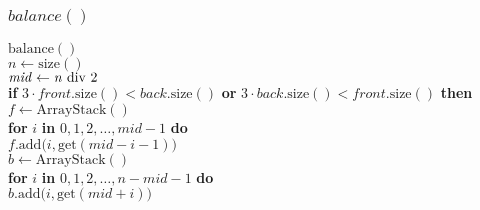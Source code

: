 \documentclass{beamer}
\begin{document}
\begin{frame}[shrink]
\frametitle{$balance()$}
\begin{oframed}
\begin{flushleft}
 $\ensuremath{\mathrm{balance}()}$\\
 \hspace*{0.5em} $\ensuremath{\ensuremath{\mathit{n}} \gets  \ensuremath{\mathrm{size}()}}$\\
 \hspace*{0.5em} $\ensuremath{\ensuremath{\mathit{mid}} \gets  \ensuremath{\ensuremath{\mathit{n}} $ div $2}}$\\
 \hspace*{0.5em} {\color{black} \textbf{if}} $\ensuremath{3\cdot \ensuremath{\mathit{front}}.\mathrm{size}() < \ensuremath{\mathit{back}}.\mathrm{size}()}$ {\color{black} \textbf{or}} $\ensuremath{3\cdot \ensuremath{\mathit{back}}.\mathrm{size}() < \ensuremath{\mathit{front}}.\mathrm{size}()}$ {\color{black} \textbf{then}} \\
\hspace*{0.5em} \hspace*{1em} $\ensuremath{\ensuremath{\mathit{f}} \gets  \ensuremath{\mathrm{\mathrm{ArrayStack}}()}}$\\
\hspace*{0.5em} \hspace*{1em} {\color{black} \textbf{for}} $\ensuremath{i}$ {\color{black} \textbf{in}} $\ensuremath{0,1,2,\ldots,\ensuremath{\mathit{mid}}-1}$ {\color{black} \textbf{do}} \\
\hspace*{0.5em} \hspace*{1em} \hspace*{1em} $\ensuremath{\ensuremath{\mathit{f}}.\mathrm{add}(\ensuremath{\mathit{i}}, \mathrm{get}(\ensuremath{\mathit{mid}}-\ensuremath{\mathit{i}}-1)})$\\
\hspace*{0.5em} \hspace*{1em} $\ensuremath{\ensuremath{\mathit{b}} \gets  \ensuremath{\mathrm{\mathrm{ArrayStack}}()}}$\\
\hspace*{0.5em} \hspace*{1em} {\color{black} \textbf{for}} $\ensuremath{i}$ {\color{black} \textbf{in}} $\ensuremath{0,1,2,\ldots,\ensuremath{\mathit{n}}-\ensuremath{\mathit{mid}}-1}$ {\color{black} \textbf{do}} \\
\hspace*{0.5em} \hspace*{1em} \hspace*{1em} $\ensuremath{\ensuremath{\mathit{b}}.\mathrm{add}(\ensuremath{\mathit{i}}, \mathrm{get}(\ensuremath{\mathit{mid}}+\ensuremath{\mathit{i}})})$ \\

\end{flushleft}
\end{oframed}
\end{frame}
\end{document}
